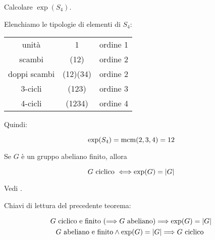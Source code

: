\begin{esercizio}
	Calcolare $\exp(S_4)$.
\end{esercizio}
\begin{soluzione}
Elenchiamo le tipologie di elementi di $S_4$:

\begin{center}
	\begin{tabular}{ccc}
		unità & 1 & ordine 1 \\
		scambi & (12) & ordine 2 \\
		doppi scambi & (12)(34) & ordine 2 \\
		3-cicli & (123) & ordine 3 \\
		4-cicli & (1234) & ordine 4
	\end{tabular}
\end{center}

Quindi:

\begin{equation}
	\exp(S_4) = \operatorname{mcm}(2, 3, 4) = 12
\end{equation}
\end{soluzione}

\begin{teorema}
	\label{thr:esponente}
	Se $G$ è un gruppo abeliano finito, allora
	
	\begin{equation}
		G \text{ ciclico } \Longleftrightarrow \exp(G) = \lvert G \rvert
	\end{equation}
\end{teorema}
\begin{dimostrazione}
	Vedi \cite[pag. 46-47]{jacobson}.
\end{dimostrazione}

Chiavi di lettura del precedente teorema:

\begin{gather}
	G \text{ ciclico e finito } (\Longrightarrow G \text{ abeliano}) \Longrightarrow \exp(G) = \lvert G \rvert \\
	G \text{ abeliano e finito} \land \exp(G) = \lvert G \rvert \Longrightarrow G \text{ ciclico }
\end{gather}

